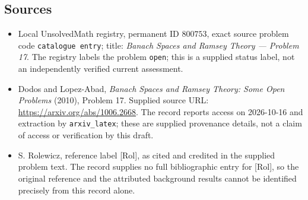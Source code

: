 \documentclass[11pt]{article}
\begin{document}
\subsection{Sources}
\begin{itemize}
\item Local UnsolvedMath registry, permanent ID \(800753\), exact source problem code \texttt{catalogue entry}; title: \emph{Banach Spaces and Ramsey Theory --- Problem 17}. The registry labels the problem \texttt{open}; this is a supplied status label, not an independently verified current assessment.
\item Dodos and Lopez-Abad, \emph{Banach Spaces and Ramsey Theory: Some Open Problems} (2010), Problem 17. Supplied source URL: \url{https://arxiv.org/abs/1006.2668}. The record reports access on 2026-10-16 and extraction by \texttt{arxiv\_latex}; these are supplied provenance details, not a claim of access or verification by this draft.
\item S. Rolewicz, reference label [Rol], as cited and credited in the supplied problem text. The record supplies no full bibliographic entry for [Rol], so the original reference and the attributed background results cannot be identified precisely from this record alone.
\end{itemize}
\end{document}
